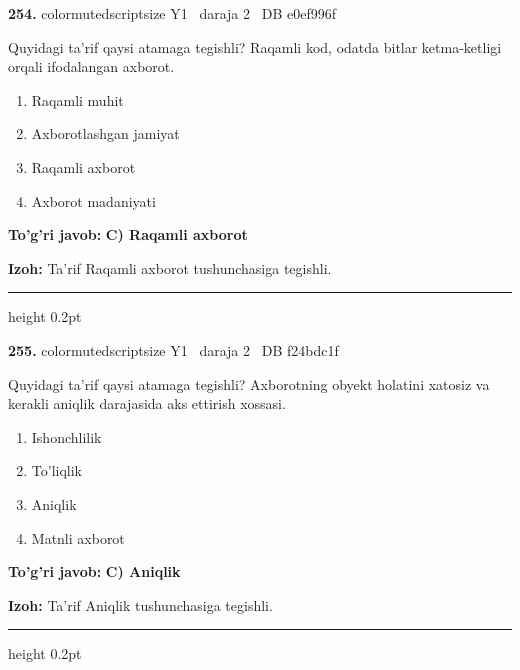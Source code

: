 \documentclass[10pt,a4paper,oneside]{article}
\begin{document}
\noindent\textbf{\color{ink}254.}  {color{muted}scriptsize Y1 \textbullet\ daraja 2 \textbullet\ DB e0ef996f}
\par
Quyidagi ta'rif qaysi atamaga tegishli? Raqamli kod, odatda bitlar ketma-ketligi orqali ifodalangan axborot.
\begin{enumerate}[label=\Alph*),leftmargin=9mm]
\item Raqamli muhit
\item Axborotlashgan jamiyat
\item Raqamli axborot
\item Axborot madaniyati
\end{enumerate}
\begin{tcolorbox}[enhanced,breakable,colback=teal!4,colframe=teal!50!black,boxrule=0.5pt,arc=1.1mm,left=3mm,right=3mm,top=1.7mm,bottom=1.7mm,before skip=2mm,after skip=2mm]
\textbf{\color{teal}To'g'ri javob:} \textbf{C) Raqamli axborot}
\par\smallskip
\textbf{Izoh:} Ta'rif Raqamli axborot tushunchasiga tegishli.
\end{tcolorbox}
\vspace{2mm}\hrule height 0.2pt \vspace{3mm}

\noindent\textbf{\color{ink}255.}  {color{muted}scriptsize Y1 \textbullet\ daraja 2 \textbullet\ DB f24bdc1f}
\par
Quyidagi ta'rif qaysi atamaga tegishli? Axborotning obyekt holatini xatosiz va kerakli aniqlik darajasida aks ettirish xossasi.
\begin{enumerate}[label=\Alph*),leftmargin=9mm]
\item Ishonchlilik
\item To'liqlik
\item Aniqlik
\item Matnli axborot
\end{enumerate}
\begin{tcolorbox}[enhanced,breakable,colback=teal!4,colframe=teal!50!black,boxrule=0.5pt,arc=1.1mm,left=3mm,right=3mm,top=1.7mm,bottom=1.7mm,before skip=2mm,after skip=2mm]
\textbf{\color{teal}To'g'ri javob:} \textbf{C) Aniqlik}
\par\smallskip
\textbf{Izoh:} Ta'rif Aniqlik tushunchasiga tegishli.
\end{tcolorbox}
\vspace{2mm}\hrule height 0.2pt \vspace{3mm}
\end{document}
